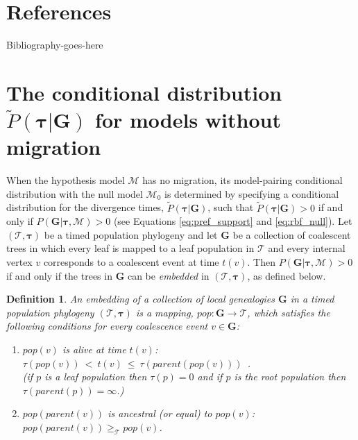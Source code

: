 \documentclass[11pt]{article}
\newcommand{\vect}[1]{\boldsymbol{\mathbf{#1}}}
\newcommand{\M}{\mathcal{M}}
\newcommand{\Tr}{\mathcal{T}}
\newcommand{\G}{\vect{G}}
\newcommand{\Pref}{\widetilde{P}}
\newcommand{\1}{\mathbbm{1}}
\newtheorem{definition}{Definition}
\newcommand{\taus}{\vect\tau}
\begin{document}
\newpage

\section{References}
Bibliography-goes-here


\newpage


\appendix
\newcommand{\anc}{\geq_\Tr}
\newcommand{\nanc}{\ngeq_\Tr}

\section{\texorpdfstring{The conditional distribution $\Pref(\taus|\G)$ for models without migration}{Conditional distribution without migration}}\label{ap:cond_nomig}

When the hypothesis model $\M$ has no migration, its model-pairing conditional distribution with the null model $\M_0$ is determined by specifying a conditional
distribution for the divergence times, $\Pref(\taus|\G)$, such that $\Pref(\taus|\G)>0$ if and only if $P(\G|\taus,\M)>0$
(see Equations \ref{eq:pref_support} and \ref{eq:rbf_null}).
%
Let $(\Tr,\taus)$ be a timed population phylogeny and let $\G$ be a collection of coalescent trees in which every leaf is mapped to a leaf population in $\Tr$
and  every internal vertex $v$ corresponds to a coalescent event at time $t(v)$.
Then $P(\G|\taus,\M)>0$ if and only if the trees in $\G$ can be \emph{embedded} in  $(\Tr,\taus)$, as defined below.
%
\begin{definition}\label{def:embed}
 An embedding of a collection of local genealogies $\G$ in a timed population phylogeny $(\Tr,\taus)$ is a mapping, $pop:\G\rightarrow\Tr$,
 which satisfies the following conditions for every coalescence event $v\in\G$:
 \begin{enumerate}
  \item $pop(v)$ is alive at time $t(v)$:~~ $\tau(pop(v)) ~<~ t(v) ~\leq~ \tau(parent(pop(v)))$~.\label{cond:time}\\
  (if $p$ is a leaf population then $\tau(p)=0$ and if $p$ is the root population then $\tau(parent(p))=\infty$.)
  \item $pop(parent(v))$ is ancestral (or equal) to $pop(v)$:~~ $pop(parent(v)) \anc pop(v)$.\label{cond:anc}
 \end{enumerate}
\end{definition}
\end{document}
